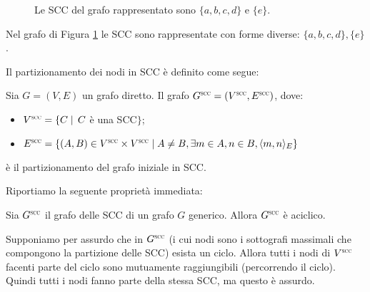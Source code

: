 \begin{example}
    \begin{figure}[t]
        \centering
        \caption{Le SCC del grafo rappresentato sono $\{a,b,c,d\}$ e $\{e\}$.}
        \label{fig:graph_cfc_1}
    \end{figure}
    Nel grafo di Figura \ref{fig:graph_cfc_1} le SCC sono rappresentate con forme diverse: $\{a,b,c,d\}, \{e\}$.
\end{example}

Il partizionamento dei nodi in SCC è definito come segue:
\begin{definition} \label{def:scc_partition}
    Sia $G = (V, E)$ un grafo diretto. Il grafo $G^{\superscc} = (V^{\superscc}, E^{\superscc})$, dove:
    \begin{itemize}
        \item $V^{\superscc} = \{C \mid \,C$ è una SCC$\}$;
        \item $E^{\superscc} = \{(A,B) \in V^{\superscc} \times V^{\superscc} \mid A \neq B, \exists m \in A, n \in B, \langle m,n \rangle_E\}$
    \end{itemize}
    è il partizionamento del grafo iniziale in SCC.
\end{definition}

Riportiamo la seguente proprietà immediata:
\begin{proposition}
    Sia $G^{\superscc}$ il grafo delle SCC di un grafo $G$ generico. Allora $G^{\superscc}$ è aciclico.
\end{proposition}
\begin{proof2}
    Supponiamo per assurdo che in $G^{\superscc}$ (i cui nodi sono i sottografi massimali che compongono la partizione delle SCC) esista un ciclo. Allora tutti i nodi di $V^{\superscc}$ facenti parte del ciclo sono mutuamente raggiungibili (percorrendo il ciclo). Quindi tutti i nodi fanno parte della stessa SCC, ma questo è assurdo.
\end{proof2}

